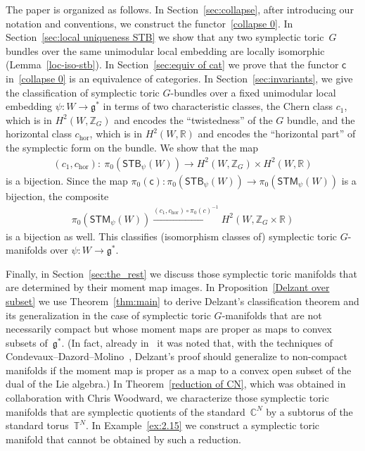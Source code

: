 \documentclass[pdftex]{sigma}
\numberwithin{equation}{section}
\begin{document}
The paper is organized as follows.
In Section~\ref{sec:collapse}, after introducing our notation and
conventions, we construct the functor~\eqref{collapse 0}.  In
Section~\ref{sec:local uniqueness STB} we show that any two symplectic
toric~$G$ bundles over the same unimodular local embedding are locally
isomorphic (Lemma~\ref{loc-iso-stb}).
In Section~\ref{sec:equiv of cat} we
prove that the functor ${\textsf{c}}$ in~\eqref{collapse 0} is an equivalence of categories.  In
Section~\ref{sec:invariants}, we give the classif\/ication of symplectic
toric $G$-bundles over a f\/ixed unimodular local embedding $\psi\colon W \to
{\mathfrak g}^*$ in terms of two characteristic classes, the Chern class
$c_1$, which is in $H^2(W,{\mathbb Z}_G)$ and encodes the ``twistedness'' of
the $G$ bundle, and the horizontal class $c_{\text{hor}}$, which is in
$H^2(W,{\mathbb R})$ and encodes the ``horizontal part'' of the symplectic form
on the bundle.  We show that the map
\begin{gather*}
(c_1, c_{\text{hor}})\colon \  \pi_0 ({\textsf{STB}}_\psi(W)) \to H^2(W, {\mathbb Z}_G)\times H^2(W, {\mathbb R})
\end{gather*}
is a bijection.  Since the map $\pi_0({\textsf{c}}) \colon \pi_0({\textsf{STB}}_{\psi}(W))
\to \pi_0({\textsf{STM}}_{\psi}(W)) $ is a bijection, the composite
\begin{gather*}
\pi_0({\textsf{STM}}_\psi (W)) \xrightarrow{(c_1,c_{\text{hor}})\circ \pi_0(c)^{-1} }
H^2(W, {\mathbb Z}_G \times {\mathbb R})
\end{gather*}
is a bijection as well.
This classif\/ies (isomorphism classes of) symplectic toric
$G$-manifolds over $\psi\colon W \to {\mathfrak g}^*$.

Finally, in Section~\ref{sec:the_rest} we discuss those symplectic
toric manifolds that are determined by their moment map images.
In Proposition~\ref{Delzant over subset} we use Theorem~\ref{thm:main}
to derive Delzant's classif\/ication theorem and its generalization in the
case of symplectic toric $G$-manifolds that are not necessarily
compact but whose moment maps are proper as maps to convex subsets of~${\mathfrak g}^*$.
(In fact, already in~\cite{ka:appendix} it was noted that,
with the techniques of Condevaux--Dazord--Molino~\cite{CDM},
Delzant's proof should generalize to non-compact manifolds if the moment map
is proper as a map to a convex open subset of the dual of the Lie algebra.)
In Theorem~\ref{reduction of CN}, which was obtained in collaboration
with Chris Woodward,
we characterize those symplectic toric manifolds that
are symplectic quotients of the standard~${\mathbb C}^N$ by a subtorus of the
standard torus~${\mathbb T}^N$.
In Example~\ref{ex:2.15} we construct
a symplectic toric manifold that cannot be obtained by such a reduction.
\end{document}
